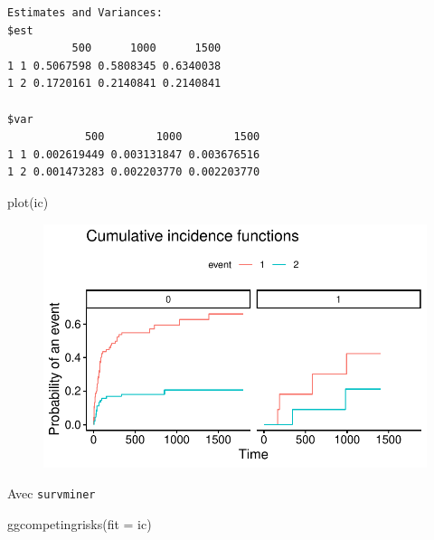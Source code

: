 \documentclass[
  12pt,
  letterpaper,
  DIV=11,
  numbers=noendperiod,
  onepage,
  openany]{scrreprt}
\newenvironment{Shaded}{\begin{snugshade}}{\end{snugshade}}
\newcommand{\AttributeTok}[1]{\textcolor[rgb]{0.80,0.80,0.80}{#1}}
\newcommand{\FunctionTok}[1]{\textcolor[rgb]{0.94,0.94,0.56}{#1}}
\newcommand{\NormalTok}[1]{\textcolor[rgb]{0.80,0.80,0.80}{#1}}
\begin{document}
\begin{verbatim}
Estimates and Variances:
$est
          500      1000      1500
1 1 0.5067598 0.5808345 0.6340038
1 2 0.1720161 0.2140841 0.2140841

$var
            500        1000        1500
1 1 0.002619449 0.003131847 0.003676516
1 2 0.001473283 0.002203770 0.002203770
\end{verbatim}

\begin{Shaded}
\begin{Highlighting}[]
\FunctionTok{plot}\NormalTok{(ic)}
\end{Highlighting}
\end{Shaded}

\begin{figure}[H]

{\centering \includegraphics{14-R_files/figure-pdf/unnamed-chunk-42-1.pdf}

}

\end{figure}

Avec \texttt{survminer}

\begin{Shaded}
\begin{Highlighting}[]
\FunctionTok{ggcompetingrisks}\NormalTok{(}\AttributeTok{fit =}\NormalTok{ ic)}
\end{Highlighting}
\end{Shaded}
\end{document}
